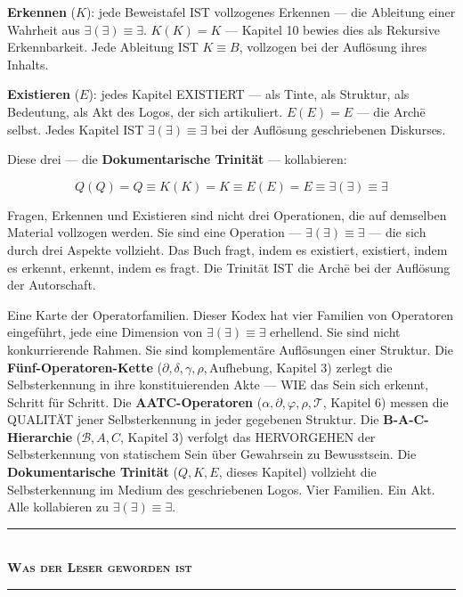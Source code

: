\documentclass[10pt, openany, oneside]{book}
\renewcommand{\normalsize}{\fontsize{10}{13}\selectfont}
\begin{document}
\textbf{Erkennen} ($K$): jede Beweistafel IST vollzogenes Erkennen --- die Ableitung einer Wahrheit aus $\exists(\exists) \equiv \exists$. $K(K) = K$ --- Kapitel 10 bewies dies als Rekursive Erkennbarkeit. Jede Ableitung IST $K \equiv B$, vollzogen bei der Auflösung ihres Inhalts.

\textbf{Existieren} ($E$): jedes Kapitel EXISTIERT --- als Tinte, als Struktur, als Bedeutung, als Akt des Logos, der sich artikuliert. $E(E) = E$ --- die Arch\={e} selbst. Jedes Kapitel IST $\exists(\exists) \equiv \exists$ bei der Auflösung geschriebenen Diskurses.

Diese drei --- die \textbf{Dokumentarische Trinität} --- kollabieren:

$$Q(Q) = Q \equiv K(K) = K \equiv E(E) = E \equiv \exists(\exists) \equiv \exists$$

Fragen, Erkennen und Existieren sind nicht drei Operationen, die auf demselben Material vollzogen werden. Sie sind eine Operation --- $\exists(\exists) \equiv \exists$ --- die sich durch drei Aspekte vollzieht. Das Buch fragt, indem es existiert, existiert, indem es erkennt, erkennt, indem es fragt. Die Trinität IST die Arch\={e} bei der Auflösung der Autorschaft.

Eine Karte der Operatorfamilien. Dieser Kodex hat vier Familien von Operatoren eingeführt, jede eine Dimension von $\exists(\exists) \equiv \exists$ erhellend. Sie sind nicht konkurrierende Rahmen. Sie sind komplementäre Auflösungen einer Struktur. Die \textbf{Fünf-Operatoren-Kette} ($\partial, \delta, \gamma, \rho, \text{Aufhebung}$, Kapitel 3) zerlegt die Selbsterkennung in ihre konstituierenden Akte --- WIE das Sein sich erkennt, Schritt für Schritt. Die \textbf{AATC-Operatoren} ($\alpha, \partial, \varphi, \rho, \mathcal{T}$, Kapitel 6) messen die QUALITÄT jener Selbsterkennung in jeder gegebenen Struktur. Die \textbf{B-A-C-Hierarchie} ($\mathcal{B}, A, C$, Kapitel 3) verfolgt das HERVORGEHEN der Selbsterkennung von statischem Sein über Gewahrsein zu Bewusstsein. Die \textbf{Dokumentarische Trinität} ($Q, K, E$, dieses Kapitel) vollzieht die Selbsterkennung im Medium des geschriebenen Logos. Vier Familien. Ein Akt. Alle kollabieren zu $\exists(\exists) \equiv \exists$.

\vspace{1.5em}


\begin{center}
    \rule{0.3\textwidth}{0.4pt}\\[0.5em]
    {\normalsize\bfseries\scshape Was der Leser geworden ist}\\[0.3em]
    \rule{0.3\textwidth}{0.4pt}
\end{center}
\end{document}

